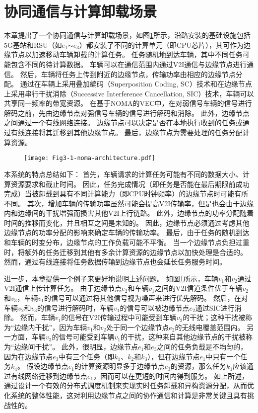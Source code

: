 \section{协同通信与计算卸载场景}\label{section 3-2}

本章提出了一个协同通信与计算卸载场景，如图\ref{fig 3-1}所示，沿路安装的基础设施包括5G基站和RSU（如$e_1$$\sim$$e_3$）都安装了不同的计算单元（即CPU芯片），其可作为边缘节点以加速移动车辆卸载的计算任务。
任务随机地到达车辆，其中不同任务可能包含不同的待计算数据。
车辆可以在通信范围内通过V2I通信与边缘节点进行通信。
然后，车辆将任务上传到附近的边缘节点，传输功率由相应的边缘节点分配。
通过在车辆上采用叠加编码（Superposition Coding, SC）技术和在边缘节点上采用串行干扰消除（Successive Interference Cancellation, SIC）\cite{khan2021noma}技术，车辆可以共享同一频率的带宽资源。
在基于NOMA的VEC中，在对弱信号车辆的信号进行解码之前，先由边缘节点对强信号车辆的信号进行解码和消除。
此外，边缘节点之间通过一个有线网络连接。
边缘节点可以决定是否在本地执行收到的任务或通过有线连接将其迁移到其他边缘节点。
最后，边缘节点为需要处理的任务分配计算资源。

\begin{figure}[h]
\centering
  \texttt{[image: Fig3-1-noma-architecture.pdf]}
  \label{fig 3-1}
\end{figure} 

本系统的特点总结如下：
首先，车辆请求的计算任务可能有不同的数据大小、计算资源要求和截止时间。
因此，任务完成情况（即任务是否能在最后期限前成功完成）当被卸载到具有不同计算能力（即CPU时钟频率）的边缘节点时可能有所不同。
其次，增加车辆的传输功率虽然可能会提高V2I传输率，但是也会由于边缘内和边缘间的干扰增强而损害其他V2I上行链路。
此外，边缘节点的功率分配随着时间的推移而变化，并且相互之间是未知的。
因此，边缘节点必须通过考虑其他边缘节点的功率分配的影响来确定车辆的传输功率。
最后，由于任务的随机到达和车辆的时变分布，边缘节点的工作负载可能不平衡。
当一个边缘节点负担过重时，将额外的任务迁移到其他有多余计算资源的边缘节点以加快处理是合适的。
然而，通过有线连接将任务数据传输到边缘节点也会延长任务服务时间。

进一步，本章提供一个例子来更好地说明上述问题。
如图\ref{fig 3-1}所示，车辆$v_1$和$v_2$通过V2I通信上传计算任务。
由于边缘节点$e_2$和车辆$v_1$之间的V2I信道条件优于车辆$v_2$和$v_3$，车辆$v_1$的信号可以通过将其他信号视为噪声来进行优先解码。
然后，在对车辆$v_2$和$v_3$的信号进行解码时，车辆$v_1$的信号可以被边缘节点$e_2$通过SIC进行消除。
然而，车辆$v_1$的信号在V2I传输过程中可能受到车辆$v_2$的干扰；这种干扰被称为“边缘内干扰”，因为车辆$v_1$和$v_2$处于同一个边缘节点$e_2$的无线电覆盖范围内。
另一方面，车辆$v_3$的信号可能受到车辆$v_1$的干扰，这种来自其他边缘节点的干扰被称为“边缘间干扰”。
此外，很明显，边缘节点$e_1$和$e_3$之间的任务负载是不均匀的，因为在边缘节点$e_3$中有三个任务（即$k_1$、$k_2$和$k_3$），但在边缘节点$e_1$中只有一个任务$k_4$。
假设边缘节点$e_1$的计算资源明显多于边缘节点$e_3$的资源，那么任务$k_1$应该通过有线网络迁移到边缘节点$e_1$，因而可以在更短的时间内得到服务。
如上所述，通过设计一个有效的分布式调度机制来实现实时任务卸载和异构资源分配，从而优化系统的整体性能，这对利用边缘节点之间的协作通信和计算是非常关键且具有挑战性的。

